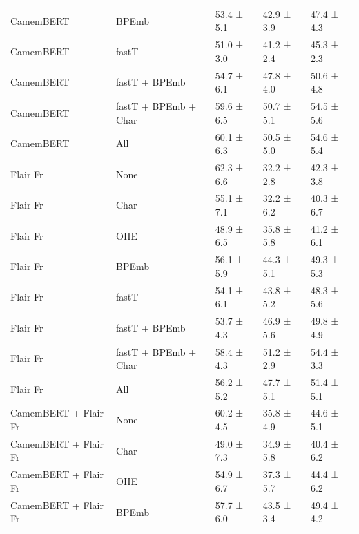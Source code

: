 \documentclass[12pt,a4paper,]{book}
\begin{document}
\begin{longtable}[t]{lllll}
\hspace{1em}CamemBERT & BPEmb & 53.4 ±  5.1 & 42.9 ±  3.9 & 47.4 ±  4.3\\
\hspace{1em}CamemBERT & fastT & 51.0 ±  3.0 & 41.2 ±  2.4 & 45.3 ±  2.3\\
\hspace{1em}CamemBERT & fastT + BPEmb & 54.7 ±  6.1 & 47.8 ±  4.0 & 50.6 ±  4.8\\
\hspace{1em}CamemBERT & fastT + BPEmb + Char & 59.6 ±  6.5 & 50.7 ±  5.1 & 54.5 ±  5.6\\
\hspace{1em}CamemBERT & All & 60.1 ±  6.3 & 50.5 ±  5.0 & 54.6 ±  5.4\\
\hspace{1em}Flair Fr & None & 62.3 ±  6.6 & 32.2 ±  2.8 & 42.3 ±  3.8\\
\hspace{1em}Flair Fr & Char & 55.1 ±  7.1 & 32.2 ±  6.2 & 40.3 ±  6.7\\
\hspace{1em}Flair Fr & OHE & 48.9 ±  6.5 & 35.8 ±  5.8 & 41.2 ±  6.1\\
\hspace{1em}Flair Fr & BPEmb & 56.1 ±  5.9 & 44.3 ±  5.1 & 49.3 ±  5.3\\
\hspace{1em}Flair Fr & fastT & 54.1 ±  6.1 & 43.8 ±  5.2 & 48.3 ±  5.6\\
\hspace{1em}Flair Fr & fastT + BPEmb & 53.7 ±  4.3 & 46.9 ±  5.6 & 49.8 ±  4.9\\
\hspace{1em}Flair Fr & fastT + BPEmb + Char & 58.4 ±  4.3 & 51.2 ±  2.9 & 54.4 ±  3.3\\
\hspace{1em}Flair Fr & All & 56.2 ±  5.2 & 47.7 ±  5.1 & 51.4 ±  5.1\\
\hspace{1em}CamemBERT + Flair Fr & None & 60.2 ±  4.5 & 35.8 ±  4.9 & 44.6 ±  5.1\\
\hspace{1em}CamemBERT + Flair Fr & Char & 49.0 ±  7.3 & 34.9 ±  5.8 & 40.4 ±  6.2\\
\hspace{1em}CamemBERT + Flair Fr & OHE & 54.9 ±  6.7 & 37.3 ±  5.7 & 44.4 ±  6.2\\
\hspace{1em}CamemBERT + Flair Fr & BPEmb & 57.7 ±  6.0 & 43.5 ±  3.4 & 49.4 ±  4.2\\

\end{longtable}
\end{document}
